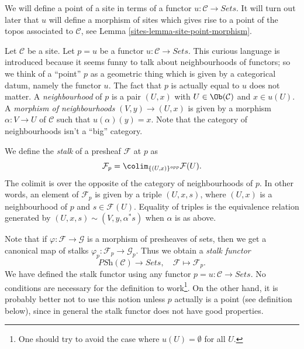 We will define a point of a site in terms of a functor
$u : \mathcal{C} \to \textit{Sets}$.
It will turn out later that $u$ will define a morphism of sites
which gives rise to a point of the topos associated to $\mathcal{C}$, see
Lemma \ref{sites-lemma-site-point-morphism}.

\medskip\noindent
Let $\mathcal{C}$ be a site. Let $p = u$ be
a functor $u : \mathcal{C} \to \textit{Sets}$.
This curious language is introduced because it
seems funny to talk about neighbourhoods of functors;
so we think of a ``point'' $p$ as a geometric thing which
is given by a categorical datum, namely the functor $u$.
The fact that $p$ is actually equal to $u$ does not matter.
A {\it neighbourhood} of $p$ is a pair $(U, x)$ with
$U \in \Ob(\mathcal{C})$ and $x \in u(U)$.
A {\it morphism of neighbourhoods} $(V, y) \to (U, x)$
is given by a morphism $\alpha :V \to U$ of $\mathcal{C}$
such that $u(\alpha)(y) = x$. Note that the category of
neighbourhoods isn't a ``big'' category.

\medskip\noindent
We define the {\it stalk} of a presheaf $\mathcal{F}$ at $p$ as
\begin{equation}
\label{equation-stalk}
\mathcal{F}_p = \colim_{\{(U, x)\}^{opp}} \mathcal{F}(U).
\end{equation}
The colimit is over the opposite of the category of
neighbourhoods of $p$. In other words, an element of
$\mathcal{F}_p$ is given by a triple $(U, x, s)$, where
$(U, x)$ is a neighbourhood of $p$ and $s \in \mathcal{F}(U)$. Equality
of triples is the equivalence relation generated by
$(U, x, s) \sim (V, y, \alpha^*s)$ when $\alpha$ is as above.

\medskip\noindent
Note that if $\varphi : \mathcal{F} \to \mathcal{G}$ is a morphism
of presheaves of sets, then we get a canonical map of stalks
$\varphi_p : \mathcal{F}_p \to \mathcal{G}_p$. Thus we obtain
a {\it stalk functor}
$$
\textit{PSh}(\mathcal{C}) \longrightarrow \textit{Sets}, \quad
\mathcal{F} \longmapsto \mathcal{F}_p.
$$
We have defined the stalk functor using any functor
$p = u : \mathcal{C} \to \textit{Sets}$. No conditions are
necessary for the definition to work\footnote{One should try to
avoid the case where $u(U) = \emptyset$ for all $U$.}. On the other hand,
it is probably better not to use this notion unless $p$
actually is a point (see definition below), since in general
the stalk functor does not have good properties.


